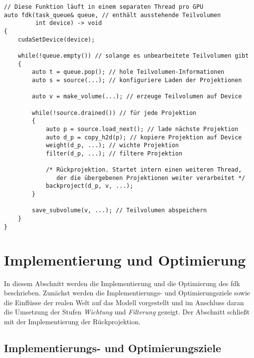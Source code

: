 \begin{code}
\begin{verbatim}
// Diese Funktion läuft in einem separaten Thread pro GPU
auto fdk(task_queue& queue, // enthält ausstehende Teilvolumen
         int device) -> void
{
    cudaSetDevice(device);

    while(!queue.empty()) // solange es unbearbeitete Teilvolumen gibt
    {
        auto t = queue.pop(); // hole Teilvolumen-Informationen
        auto s = source(...); // konfiguriere Laden der Projektionen

        auto v = make_volume(...); // erzeuge Teilvolumen auf Device

        while(!source.drained()) // für jede Projektion
        {
            auto p = source.load_next(); // lade nächste Projektion
            auto d_p = copy_h2d(p); // kopiere Projektion auf Device
            weight(d_p, ...); // wichte Projektion
            filter(d_p, ...); // filtere Projektion

            /* Rückprojektion. Startet intern einen weiteren Thread,
               der die übergebenen Projektionen weiter verarbeitet */
            backproject(d_p, v, ...);
        }

        save_subvolume(v, ...); // Teilvolumen abspeichern
    }
}     
\end{verbatim}
\label{source:high_level_fdk}
\end{code}

\section{Implementierung und Optimierung}

In diesem Abschnitt werden die Implementierung und die Optimierung des \gls{fdk} beschrieben. Zunächst werden die
Implementierungs- und Optimierungsziele sowie die Einflüsse der realen Welt auf das Modell vorgestellt und im Anschluss
daran die Umsetzung der Stufen \textit{Wichtung} und \textit{Filterung} gezeigt. Der Abschnitt schließt mit der
Implementierung der Rückprojektion.

\subsection{Implementierungs- und Optimierungsziele}

